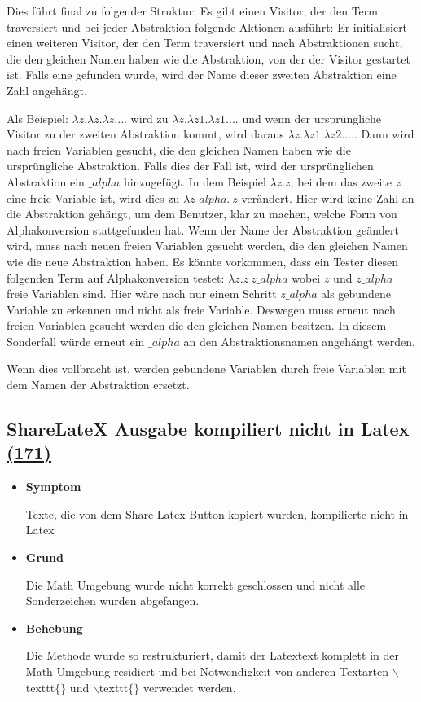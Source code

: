\documentclass[parskip=full,11pt,twoside]{scrartcl}
\newcommand{\issueref}[1]{
    \href{https://git.scc.kit.edu/ap/Aurora/issues/#1}{(#1)}
}
\newcommand{\regrtest}[5]{
    \subsection{#1 \issueref{#2}}
    \begin{itemize}
        \item \textbf{Symptom}
            #3
        \item \textbf{Grund}
            #4
        \item \textbf{Behebung}
            #5
    \end{itemize}
}
\begin{document}
{        Dies führt final zu folgender Struktur:
           Es gibt einen Visitor, der den Term traversiert und bei jeder Abstraktion folgende Aktionen ausführt:
           Er initialisiert einen weiteren Visitor, der den Term traversiert und nach Abstraktionen sucht, die den gleichen Namen haben wie die Abstraktion,
            von der der Visitor gestartet ist.
        Falls eine gefunden wurde, wird der Name dieser zweiten Abstraktion eine Zahl angehängt.

        Als Beispiel: $\lambda z. \lambda z. \lambda z. ...$ wird zu $\lambda z. \lambda z1. \lambda z1. ...$
            und wenn der ursprüngliche Visitor zu der zweiten Abstraktion kommt, wird daraus $\lambda z. \lambda z1. \lambda z2. ...$.
           Dann wird nach freien Variablen gesucht, die den gleichen Namen haben wie die ursprüngliche Abstraktion.
        Falls dies der Fall ist, wird der ursprünglichen Abstraktion ein $\_ alpha$ hinzugefügt.
        In dem Beispiel $\lambda z. z$, bei dem das zweite $z$ eine freie Variable ist, wird dies zu $\lambda z \_ alpha. \  z$ verändert.
           Hier wird keine Zahl an die Abstraktion gehängt, um dem Benutzer, klar zu machen, welche Form von Alphakonversion stattgefunden hat.
           Wenn der Name der Abstraktion geändert wird, muss  nach neuen freien Variablen gesucht werden, die den gleichen Namen wie die neue Abstraktion haben.
        Es könnte vorkommen, dass ein Tester diesen folgenden Term auf Alphakonversion testet:
            $\lambda z. z \ z\_ alpha$ wobei $z$ und $z\_ alpha$ freie Variablen sind.
           Hier wäre nach nur einem Schritt $z\_ alpha$ als gebundene Variable zu erkennen und nicht als freie Variable.
           Deswegen muss erneut nach freien Variablen gesucht werden die den gleichen Namen besitzen.
           In diesem Sonderfall würde erneut ein $\_ alpha$ an den Abstraktionsnamen angehängt werden.

           Wenn dies vollbracht ist, werden gebundene Variablen durch freie Variablen mit dem Namen der Abstraktion ersetzt.
    }
    
    \regrtest{ShareLateX Ausgabe kompiliert nicht in Latex}{171}
    {
	    Texte, die von dem Share Latex Button kopiert wurden, kompilierte nicht in Latex
    }{
	    Die Math Umgebung wurde nicht korrekt geschlossen und nicht alle Sonderzeichen wurden abgefangen.
    }{
	    Die Methode wurde so restrukturiert, damit der Latextext komplett in der Math Umgebung residiert und
	    bei Notwendigkeit von anderen Textarten $\backslash$texttt$\{ \}$  und $\backslash$texttt$\{ \}$
	    verwendet werden.
    }
    
\end{document}
